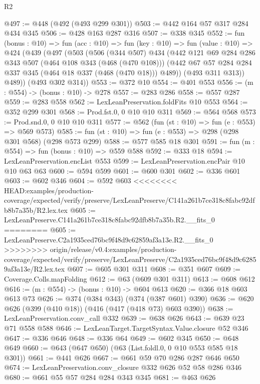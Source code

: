 \begin{lexlean}{R2}
\begin{coremodule}
{{{{{{{{{{{{{{{{{{{{{{@497 := @448 (@492 (@493 @299 @301))
@503 := @442 @164 @57 @317 @284 @434 @345
@506 := @428 @163 @287 @316
@507 := @338 @345
@552 := fun (bonus : @10) =>
  fun (acc : @10) =>
  fun (key : @10) =>
  fun (value : @10) =>
  @424
    (@439
      (@497
        (@503
          (@506
            (@344 @507)
            @434
            (@442
              @121
              @69
              @284
              @286
              @343
              @507
              (@464 @108 @343 (@468 (@470 @108)))
              (@442 @67 @57 @284 @284 @337 @345 (@464 @18 @337 (@468 (@470 @18))) @489))
            (@493 @311 @313))
          @489))
      (@493 @302 @314))
@553 := @372 @10
@554 := @401 @553
@556 := (m : @554) -> (bonus : @10) -> @278
@557 := @283 @286
@558 := @557 @287
@559 := @283 @558
@562 := LexLeanPreservation.foldFits @10 @553
@564 := @352 @299 @301
@568 := Prod.fst.{0, 0} @10 @10 @311
@569 := @564 @568
@573 := Prod.snd.{0, 0} @10 @10 @311
@577 := @562 (fun (st : @10) => fun (e : @553) => @569 @573)
@585 := fun (st : @10) => fun (e : @553) => @298 (@298 @301 @568) (@298 @573 @299)
@588 := @577 @585 @18 @301
@591 := fun (m : @554) => fun (bonus : @10) => @559 @588
@592 := @333 @18
@594 := LexLeanPreservation.encList @553
@599 := LexLeanPreservation.encPair @10 @10 @63 @63
@600 := @594 @599
@601 := @600 @301
@602 := @336 @601
@603 := @602 @346
@604 := @592 @603
<<<<<<<< HEAD:examples/production-coverage/expected/verify/preserve/LexLeanPreserve/C141a261b7ce318c8fabc92dfb8b7a35b/R2.lex.tex
@605 := LexLeanPreserve.C141a261b7ce318c8fabc92dfb8b7a35b.R2.__fits_0
========
@605 := LexLeanPreserve.C2a1935ced76bc9f48d9c62859af3a13e.R2.__fits_0
>>>>>>>> origin/release/v0.4:examples/production-coverage/expected/verify/preserve/LexLeanPreserve/C2a1935ced76bc9f48d9c62859af3a13e/R2.lex.tex
@607 := @605 @301 @311
@608 := @351 @607
@609 := Coverage.Colls.mapFolding
@612 := @63 (@609 @301 @311)
@613 := @608 @612
@616 := (m : @554) -> (bonus : @10) -> @604 @613
@620 := @366 @18 @603 @613 @73
@626 := @374 (@384 @343) (@374 (@387 @601) @390)
@636 := @620 @626 (@399 (@410 @18)) (@416 (@417 (@418 @73) @603 @390))
@638 := LexLeanPreservation.conv_call @332
@639 := @638 @626
@643 := @639 @23 @71 @558 @588
@646 := LexLeanTarget.TargetSyntax.Value.closure @52 @346
@647 := @336 @646
@648 := @336 @64
@649 := @602 @345
@650 := @648 @649
@660 := @643 (@647 @650) (@63 (List.foldl.{0, 0} @10 @553 @585 @18 @301))
@661 := @441 @626
@667 := @661 @59 @70 @286 @287 @646 @650
@674 := LexLeanPreservation.conv_closure @332 @626 @52 @58 @286 @346
@680 := @661 @55 @57 @284 @284 @343 @345
@681 := @463 @626
}}}}}}}}}}}}}}}}}}}}}}
\end{coremodule}
\end{lexlean}
